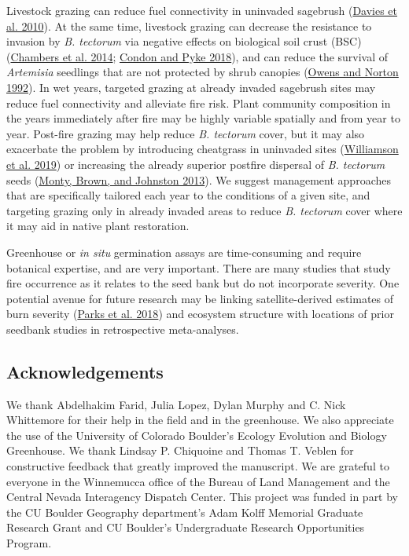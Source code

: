\documentclass[
  12pt,
]{article}
\begin{document}
Livestock grazing can reduce fuel connectivity in uninvaded sagebrush
(\protect\hyperlink{ref-Davies2010}{Davies et al. 2010}). At the same
time, livestock grazing can decrease the resistance to invasion by
\emph{B. tectorum} via negative effects on biological soil crust (BSC)
(\protect\hyperlink{ref-chambers_resilience_2014}{Chambers et al. 2014};
\protect\hyperlink{ref-Condon2018}{Condon and Pyke 2018}), and can
reduce the survival of \emph{Artemisia} seedlings that are not protected
by shrub canopies (\protect\hyperlink{ref-Owens1992}{Owens and Norton
1992}). In wet years, targeted grazing at already invaded sagebrush
sites may reduce fuel connectivity and alleviate fire risk. Plant
community composition in the years immediately after fire may be highly
variable spatially and from year to year. Post-fire grazing may help
reduce \emph{B. tectorum} cover, but it may also exacerbate the problem
by introducing cheatgrass in uninvaded sites
(\protect\hyperlink{ref-Williamson2019}{Williamson et al. 2019}) or
increasing the already superior postfire dispersal of \emph{B. tectorum}
seeds (\protect\hyperlink{ref-Monty2013}{Monty, Brown, and Johnston
2013}). We suggest management approaches that are specifically tailored
each year to the conditions of a given site, and targeting grazing only
in already invaded areas to reduce \emph{B. tectorum} cover where it may
aid in native plant restoration.

Greenhouse or \emph{in situ} germination assays are time-consuming and
require botanical expertise, and are very important. There are many
studies that study fire occurrence as it relates to the seed bank but do
not incorporate severity. One potential avenue for future research may
be linking satellite-derived estimates of burn severity
(\protect\hyperlink{ref-Parks2018}{Parks et al. 2018}) and ecosystem
structure with locations of prior seedbank studies in retrospective
meta-analyses.

\hypertarget{acknowledgements}{%
\subsection{Acknowledgements}\label{acknowledgements}}

We thank Abdelhakim Farid, Julia Lopez, Dylan Murphy and C. Nick
Whittemore for their help in the field and in the greenhouse. We also
appreciate the use of the University of Colorado Boulder's Ecology
Evolution and Biology Greenhouse. We thank Lindsay P. Chiquoine and
Thomas T. Veblen for constructive feedback that greatly improved the
manuscript. We are grateful to everyone in the Winnemucca office of the
Bureau of Land Management and the Central Nevada Interagency Dispatch
Center. This project was funded in part by the CU Boulder Geography
department's Adam Kolff Memorial Graduate Research Grant and CU
Boulder's Undergraduate Research Opportunities Program.
\end{document}
